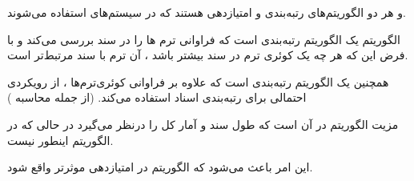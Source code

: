 \newpage

\begin{boxC}
    \begin{center}
    \newline
    \newline
    \newline
    \newline
    \newline
    \newline
    \newline
    \newline
    \newline
    \end{center}

    \begin{center}
    \newline
    \newline
    \newline
    \newline
    \end{center}
\end{boxC}

\begin{boxA}
    و
    هر دو الگوریتم‌های رتبه‌بندی و امتیازدهی هستند که در سیستم‌های 
    استفاده می‌شوند.

    الگوریتم 
    یک الگوریتم رتبه‌بندی است که فراوانی ترم ها را در سند بررسی می‌کند و با فرض این‌ که هر چه یک کوئری ترم در سند بیشتر باشد ، آن ترم با سند مرتبط‌تر است.

    همچنین یک الگوریتم رتبه‌بندی است که علاوه بر فراوانی کوئری‌ترم‌ها ، از رویکردی احتمالی برای رتبه‌بندی اسناد استفاده می‌کند.
    (از جمله محاسبه 
    )

    مزیت الگوریتم 
    در آن است که طول سند و آمار کل 
    را درنظر می‌گیرد در حالی که در الگوریتم
    اینطور نیست.

    این امر باعث می‌شود که الگوریتم 
    در امتیازدهی موثرتر واقع شود.
\end{boxA}

\newpage